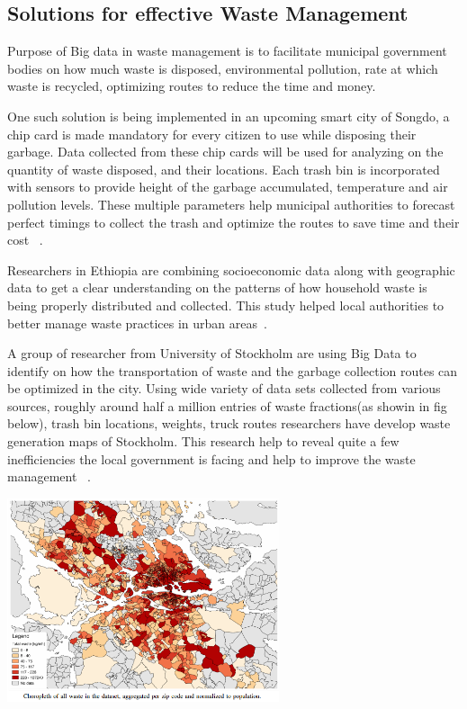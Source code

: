 \documentclass[sigconf]{acmart}
\begin{document}

\subsection{Solutions for effective Waste Management}


Purpose of Big data in waste management is to facilitate municipal government bodies on how much waste is disposed, environmental pollution, rate at which waste is recycled, optimizing routes to reduce the time and money.

One such solution is being implemented in an upcoming smart city of Songdo, a chip card is made mandatory for every citizen to use while disposing their garbage. Data collected from these chip cards will be used for analyzing on the quantity of waste disposed, and their locations. Each trash bin is incorporated with sensors to provide height of the garbage accumulated, temperature and air pollution levels. These multiple parameters help municipal authorities to forecast perfect timings to collect the trash and optimize the routes to save time and their cost ~\cite{markvan2016}.

Researchers in Ethiopia are combining socioeconomic data along with geographic data to get a clear understanding on the patterns of how household waste is being properly distributed and collected. This study helped local authorities to better manage waste practices in urban areas~\cite{markvan2016}. 

A group of researcher from University of Stockholm are using Big Data to identify on how the transportation of waste and the garbage collection routes can be optimized in the city. Using wide variety of data sets collected from various sources, roughly around half a million entries of waste fractions(as showin in fig below), trash bin locations, weights, truck routes researchers have develop waste generation maps of Stockholm. This research help to reveal quite a few inefficiencies the local government is facing and help to improve the waste management ~\cite{markvan2016}.

\includegraphics[width=8cm, height=6cm]{stockholm.png}
\end{document}
